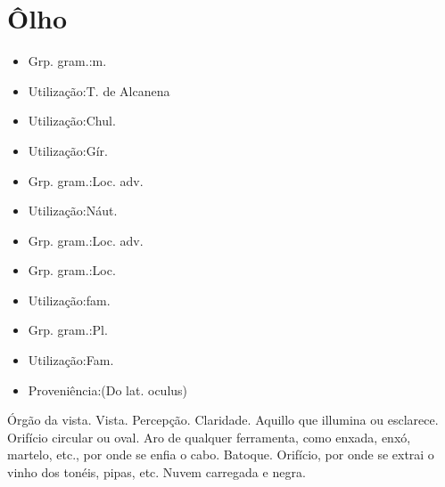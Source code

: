\section{Ôlho}
\begin{itemize}
\item {Grp. gram.:m.}
\end{itemize}
\begin{itemize}
\item {Utilização:T. de Alcanena}
\end{itemize}
\begin{itemize}
\item {Utilização:Chul.}
\end{itemize}
\begin{itemize}
\item {Utilização:Gír.}
\end{itemize}
\begin{itemize}
\item {Grp. gram.:Loc. adv.}
\end{itemize}
\begin{itemize}
\item {Utilização:Náut.}
\end{itemize}
\begin{itemize}
\item {Grp. gram.:Loc. adv.}
\end{itemize}
\begin{itemize}
\item {Grp. gram.:Loc.}
\end{itemize}
\begin{itemize}
\item {Utilização:fam.}
\end{itemize}
\begin{itemize}
\item {Grp. gram.:Pl.}
\end{itemize}
\begin{itemize}
\item {Utilização:Fam.}
\end{itemize}
\begin{itemize}
\item {Proveniência:(Do lat. \textunderscore oculus\textunderscore )}
\end{itemize}
Órgão da vista.
Vista.
Percepção.
Claridade.
Aquillo que illumina ou esclarece.
Orifício circular ou oval.
Aro de qualquer ferramenta, como enxada, enxó, martelo, etc., por onde se enfia o cabo.
Batoque.
Orifício, por onde se extrai o vinho dos tonéis, pipas, etc.
Nuvem carregada e negra.
